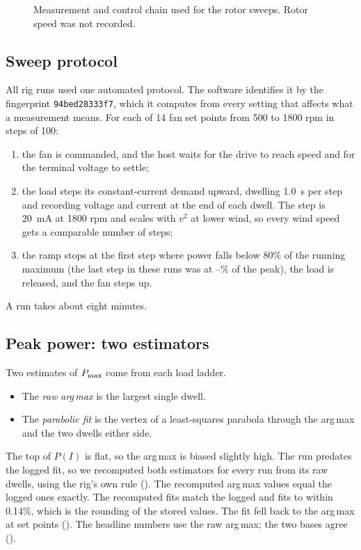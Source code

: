 \documentclass[11pt]{article}
\begin{document}
\begin{figure}[t]
  \centering
  
  \caption{Measurement and control chain used for the rotor sweeps. Rotor speed was not
  recorded.}
  \label{fig:rig}
\end{figure}

\subsection{Sweep protocol}
All rig runs used one automated protocol. The software identifies it by the fingerprint
\texttt{94bed28333f7}, which it computes from every setting that affects what a measurement
means. For each of 14 fan set points from 500 to 1800 rpm in steps of 100:
\begin{enumerate}
  \item the fan is commanded, and the host waits for the drive to reach speed and for the
        terminal voltage to settle;
  \item the load steps its constant-current demand upward, dwelling \SI{1.0}{s} per step and
        recording voltage and current at the end of each dwell. The step is \SI{20}{mA} at
        1800 rpm and scales with $v^2$ at lower wind, so every wind speed gets a comparable
        number of steps;
  \item the ramp stops at the first step where power falls below 80\% of the running maximum
        (the last step in these runs was at \rolloffmin–\rolloffmax\% of the peak), the load
        is released, and the fan steps up.
\end{enumerate}
A run takes about eight minutes.

\subsection{Peak power: two estimators}
Two estimates of $P_{\max}$ come from each load ladder.
\begin{itemize}
  \item The \emph{raw arg\,max} is the largest single dwell.
  \item The \emph{parabolic fit} is the vertex of a least-squares parabola through the
        arg\,max and the two dwells either side.
\end{itemize}
The top of $P(I)$ is flat, so the arg\,max is biased slightly high. The  run predates
the logged fit, so we recomputed both estimators for every run from its raw dwells, using the
rig's own rule (). The recomputed arg\,max values equal the logged ones
exactly. The recomputed fits match the logged  and  fits to within 0.14\%, which
is the rounding of the stored values. The fit fell back to the arg\,max at \nfallback{} set points (\fallbacklist). The
headline numbers use the raw arg\,max; the two bases agree ().
\end{document}
